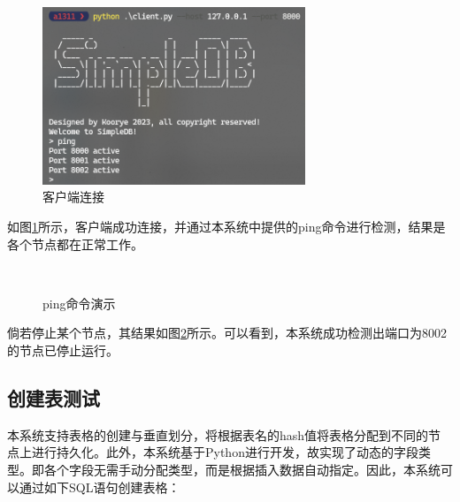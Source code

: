 \begin{figure}[H]
    \includegraphics[width=0.7\textwidth]{examples/状态检测.png}
    \centering
    \caption{客户端连接}
    \label{fig:test-client}
\end{figure}

如图\ref{fig:test-client}所示，客户端成功连接，并通过本系统中提供的ping命令进行检测，结果是各个节点都在正常工作。

\begin{figure}[H]
    \centering
     \\
    \caption{ping命令演示}
    \label{fig:test-client2}
\end{figure}

倘若停止某个节点，其结果如图\ref{fig:test-client2}所示。可以看到，本系统成功检测出端口为8002的节点已停止运行。

\subsection{创建表测试}

本系统支持表格的创建与垂直划分，将根据表名的hash值将表格分配到不同的节点上进行持久化。此外，本系统基于Python进行开发，故实现了动态的字段类型。即各个字段无需手动分配类型，而是根据插入数据自动指定。因此，本系统可以通过如下SQL语句创建表格：

